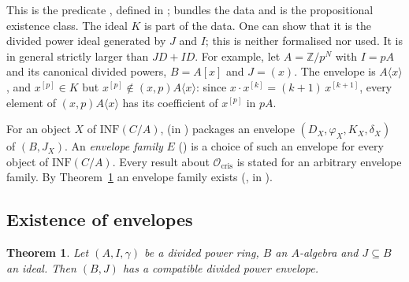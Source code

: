 \documentclass[11pt]{amsart}
\newcommand{\spa}{\medskip}
\newcommand{\Ocris}{\mathcal{O}_{\mathrm{cris}}}
\newcommand{\INF}{\mathrm{INF}}
\theoremstyle{plain}
\newtheorem{theorem}{Theorem}[section]
\theoremstyle{definition}
\theoremstyle{remark}
\begin{document}
This is the predicate , defined in ;  bundles the data and  is the propositional existence class. The ideal $K$ is part of the data. One can show that it is the divided power ideal generated by $J$ and $I$; this is neither formalised nor used. It is in general strictly larger than $JD + ID$. For example, let $A = \mathbb{Z}/p^N$ with $I = pA$ and its canonical divided powers, $B = A[x]$ and $J = (x)$. The envelope is $A\langle x \rangle$, and $x^{[p]} \in K$ but $x^{[p]} \notin (x,p)A\langle x \rangle$: since $x \cdot x^{[k]} = (k+1)\,x^{[k+1]}$, every element of $(x,p)A\langle x\rangle$ has its coefficient of $x^{[p]}$ in $pA$.

\spa

For an object $X$ of $\INF(C/A)$,  (in ) packages an envelope $(D_X, \varphi_X, K_X, \delta_X)$ of $(B, J_X)$. An \emph{envelope family} $E$ () is a choice of such an envelope for every object of $\INF(C/A)$. Every result about $\Ocris$ is stated for an arbitrary envelope family. By Theorem~\ref{thm:envelope-existence} an envelope family exists (,  in ).

\subsection{Existence of envelopes}

\begin{theorem}\label{thm:envelope-existence}
Let $(A, I, \gamma)$ be a divided power ring, $B$ an $A$-algebra and $J \subseteq B$ an ideal. Then $(B, J)$ has a compatible divided power envelope.
\end{theorem}
\end{document}
